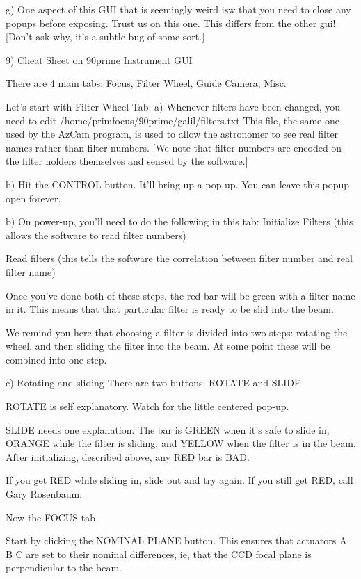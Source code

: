 \documentclass[letterpaper,12pt]{article}
\begin{document}
g) One aspect of this GUI that is seemingly weird isw that you need to
   close any popups before exposing. Trust us on this one.  This
   differs from the other gui! [Don't ask why, it's a subtle bug of
   some sort.]

9) Cheat Sheet on 90prime Instrument GUI

   There are 4 main tabs: Focus, Filter Wheel, Guide Camera, Misc.

   Let's start with Filter Wheel Tab:
   a) Whenever filters have been changed, you need to edit
      /home/primfocus/90prime/galil/filters.txt
      This file, the same one used by the AzCam program, is
      used to allow the astronomer to see real filter names
      rather than filter numbers. [We note that filter
      numbers are encoded on the filter holders themselves
      and sensed by the software.]

   b) Hit the CONTROL button. It'll bring up a pop-up.
      You can leave this popup open forever.

   b) On power-up, you'll need to do the following in this tab:
      Initialize Filters (this allows the software to read filter numbers)

      Read filters (this tells the software the correlation between
       filter number and real filter name)

      Once you've done both of these steps, the red bar will be green
      with a filter name in it. This means that that particular
      filter is ready to be slid into the beam.

      We remind you here that choosing a filter is divided into
      two steps: rotating the wheel, and then sliding the filter
      into the beam. At some point these will be combined into
      one step.

   c) Rotating and sliding
      There are two buttons: ROTATE and SLIDE

     ROTATE is self explanatory. Watch for the little centered pop-up.

     SLIDE needs one explanation. The bar is GREEN when it's
     safe to slide in, ORANGE while the filter is sliding, and
     YELLOW when the filter is in the beam. After initializing,
     described above, any RED bar is BAD.

     If you get RED while sliding in, slide out and try again.
     If you still get RED, call Gary Rosenbaum.

 
     Now the FOCUS tab

     Start by clicking the NOMINAL PLANE button. This ensures
     that actuators A B C are set to their nominal differences,
     ie, that the CCD focal plane is perpendicular to the beam.
\end{document}
